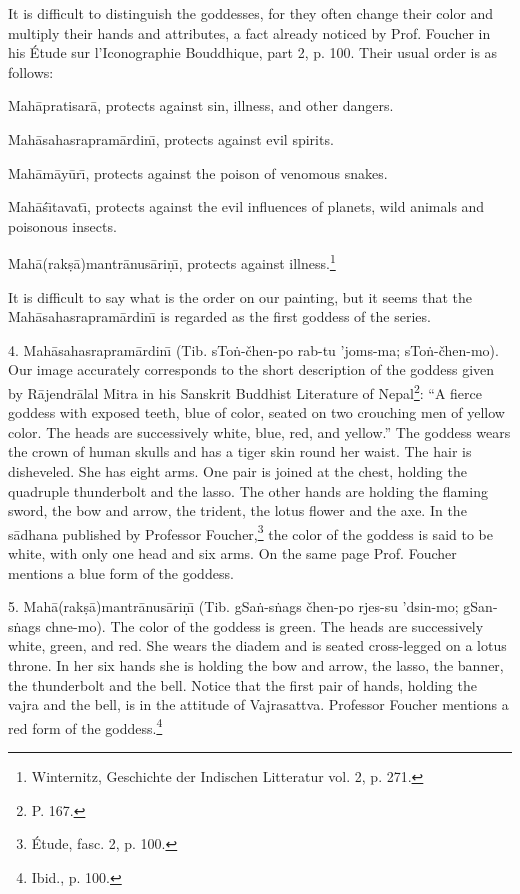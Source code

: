 \documentclass[a4paper, 12pt, oneside]{article}
\begin{document}
It is difficult to distinguish the goddesses, for they often change their color and multiply their hands and attributes, a fact already noticed by Prof. Foucher in his Étude sur l'Iconographie Bouddhique, part 2, p. 100. Their usual order is as follows:

Mah\={a}pratisar\={a}, protects against sin, illness, and other dangers.

Mah\={a}sahasrapram\={a}rdin\={\i}, protects against evil spirits.

Mah\={a}m\={a}y\={u}r\={\i}, protects against the poison of venomous snakes.

Mah\={a}\'{s}\={\i}tavat\={\i}, protects against the evil influences of planets, wild animals and poisonous insects.

Mah\={a}(rak\d{s}\={a})mantr\={a}nus\={a}ri\d{n}\={\i}, protects against illness.\footnote{Winternitz, Geschichte der Indischen Litteratur vol. 2, p. 271.}

It is difficult to say what is the order on our painting, but it seems that the Mah\={a}sahasrapram\={a}rdin\={\i} is regarded as the first goddess of the series.

4. Mah\={a}sahasrapram\={a}rdin\={\i} (Tib. sTo\.{n}-čhen-po rab-tu 'joms-ma; sTo\.{n}-čhen-mo). Our image accurately corresponds to the short description of the goddess given by R\={a}jendr\={a}lal Mitra in his Sanskrit Buddhist Literature of Nepal\footnote{P. 167.}: ``A fierce goddess with exposed teeth, blue of color, seated on two crouching men of yellow color. The heads are successively white, blue, red, and yellow.'' The goddess wears the crown of human skulls and has a tiger skin round her waist. The hair is disheveled. She has eight arms. One pair is joined at the chest, holding the quadruple thunderbolt and the lasso. The other hands are holding the flaming sword, the bow and arrow, the trident, the lotus flower and the axe. In the s\={a}dhana published by Professor Foucher,\footnote{Étude, fasc. 2, p. 100.} the color of the goddess is said to be white, with only one head and six arms. On the same page Prof. Foucher mentions a blue form of the goddess.

5. Mah\={a}(rak\d{s}\={a})mantr\={a}nus\={a}ri\d{n}\={\i} (Tib. gSa\.{n}-s\.{n}ags čhen-po rjes-su 'dsin-mo; gSan-s\.{n}ags chne-mo). The color of the goddess is green. The heads are successively white, green, and red. She wears the diadem and is seated cross-legged on a lotus throne. In her six hands she is holding the bow and arrow, the lasso, the banner, the thunderbolt and the bell. Notice that the first pair of hands, holding the vajra and the bell, is in the attitude of Vajrasattva. Professor Foucher mentions a red form of the goddess.\footnote{Ibid., p. 100.}
\end{document}
